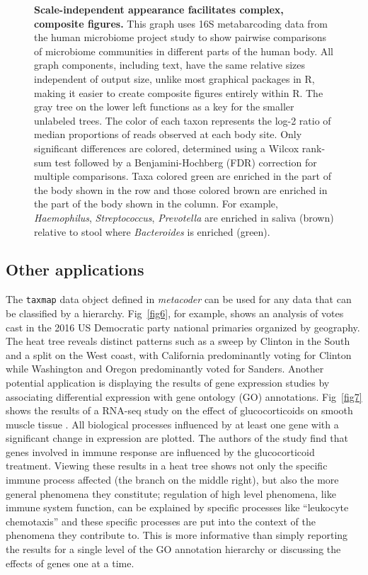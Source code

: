 \documentclass[10pt,letterpaper]{article}
\begin{document}
\begin{figure}[!h]
\caption{{\bf Scale-independent appearance facilitates complex,
		composite figures.}
This graph uses 16S metabarcoding data from the
human microbiome project study to show pairwise comparisons of
microbiome communities in different parts of the human body. All graph
components, including text, have the same relative sizes independent of
output size, unlike most graphical packages in R, making it easier to
create composite figures entirely within R. The gray tree on the lower
left functions as a key for the smaller unlabeled trees. The color of
each taxon represents the log-2 ratio of median proportions of reads
observed at each body site. Only significant differences are colored,
determined using a Wilcox rank-sum test followed by a Benjamini-Hochberg
(FDR) correction for multiple comparisons. Taxa colored green are
enriched in the part of the body shown in the row and those colored
brown are enriched in the part of the body shown in the column. For
example, \emph{Haemophilus}, \emph{Streptococcus}, \emph{Prevotella} are
enriched in saliva (brown) relative to stool where \emph{Bacteroides} is
enriched (green).}
\label{fig5}
\end{figure}


\subsection*{Other applications}\label{other-applications}

The \texttt{taxmap} data object defined in \emph{metacoder} can be used
for any data that can be classified by a hierarchy. Fig~\ref{fig6}, for
example, shows an analysis of votes cast in the 2016 US Democratic party
national primaries organized by geography. The heat tree reveals
distinct patterns such as a sweep by Clinton in the South and a split on
the West coast, with California predominantly voting for Clinton while
Washington and Oregon predominantly voted for Sanders. Another potential
application is displaying the results of gene expression studies by
associating differential expression with gene ontology (GO) annotations.
Fig~\ref{fig7} shows the results of a RNA-seq study on the effect of
glucocorticoids on smooth muscle tissue \cite{himes2014rna}. All
biological processes influenced by at least one gene with a significant
change in expression are plotted. The authors of the study find that
genes involved in immune response are influenced by the glucocorticoid
treatment. Viewing these results in a heat tree shows not only the
specific immune process affected (the branch on the middle right), but
also the more general phenomena they constitute; regulation of high
level phenomena, like immune system function, can be explained by
specific processes like ``leukocyte chemotaxis'' and these specific
processes are put into the context of the phenomena they contribute to.
This is more informative than simply reporting the results for a single
level of the GO annotation hierarchy or discussing the effects of genes
one at a time.
\end{document}
